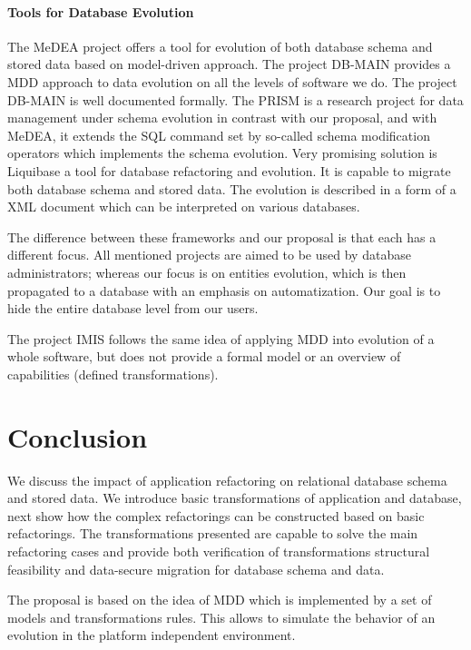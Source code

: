 \documentclass[runningheads]{comsis}
\begin{document}
\paragraph{Tools for Database Evolution} The MeDEA project \cite{Meda:Main} offers a tool for evolution of both database schema and stored data based on model-driven approach. The project DB-MAIN \cite{Hick:DBMAIN} provides a MDD approach to data evolution on all the levels of software we do. The project DB-MAIN is well documented formally. The PRISM is a research project for data management under schema evolution \cite{PRISM} in contrast with our proposal, and with MeDEA, it extends the SQL command set by so-called schema modification operators which implements the schema evolution.  Very promising solution is Liquibase \cite{Liquibase} a tool for database refactoring and evolution. It is capable to migrate both database schema and stored data. The evolution is described in a form of a XML document which can be interpreted on various databases. 

The difference between these frameworks and our proposal is that each has a different focus. All mentioned projects are aimed to  be used by database administrators; whereas our focus is on entities evolution, which is then propagated to a database with an emphasis on automatization. Our goal is to hide the entire database level from our users.

The project IMIS \cite{Bordbar:ModelBasedMigration} follows the same idea of applying MDD into evolution of a whole software, but does not provide a formal model or an overview of capabilities (defined transformations).

\section{Conclusion}
We discuss the impact of application refactoring on relational database schema and stored data. We introduce basic transformations of application and database, next show how the complex refactorings can be constructed based on basic refactorings. The transformations presented are capable to solve the main refactoring cases and provide both verification of transformations structural feasibility and data-secure migration for database schema and data. 

The proposal is based on the idea of MDD which is implemented by a set of models and transformations rules. This allows to simulate the behavior of an evolution in the platform independent environment.
\end{document}
